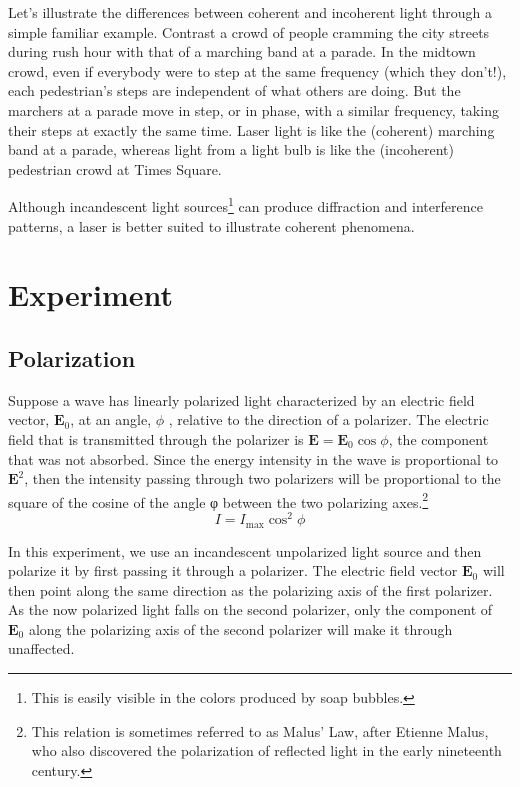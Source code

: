 Let's illustrate the differences between coherent and incoherent light through a simple familiar example. Contrast a crowd of people cramming the city streets during rush hour with that of a marching band at a parade. In the midtown crowd, even if everybody were to step at the same frequency (which they don't!), each pedestrian's steps are independent of what others are doing. But the marchers at a parade move in step, or in phase, with a similar frequency, taking their steps at exactly the same time. Laser light is like the (coherent) marching band at a parade, whereas light from a light bulb is like the (incoherent) pedestrian crowd at Times Square.\myskip

Although incandescent light sources\footnote{This is easily visible in the colors produced by soap bubbles.} can produce diffraction and interference patterns, a laser is better suited to illustrate coherent phenomena.

\section{Experiment}
\subsection{Polarization}
Suppose a wave has linearly polarized light characterized by an electric field vector, $\mathbf{E}_{0}$, at an angle, $\phi$ , relative to the direction of a polarizer. The electric field that is transmitted through the polarizer is $\mathbf{E}=\mathbf{E}_{0}\cos\phi$, the component that was not absorbed. Since the energy intensity in the wave is proportional to $\mathbf{E}^2$, then the intensity passing through two polarizers will be proportional to the square of the cosine of the angle φ between the two polarizing axes.\footnote{This relation is sometimes referred to as Malus' Law, after Etienne Malus, who also discovered the polarization of reflected light in the early nineteenth century.}
\begin{equation}
 I=I_{\mathrm{max}}\cos^2\phi
\label{eq:i}
\end{equation}

In this experiment, we use an incandescent unpolarized light source and then polarize it by first passing it through a polarizer. The electric field vector $\mathbf{E}_{0}$ will then point along the same direction as the polarizing axis of the first polarizer. As the now polarized light falls on the second polarizer, only the component of $\mathbf{E}_{0}$ along the polarizing axis of the second polarizer will make it through unaffected. \myskip

